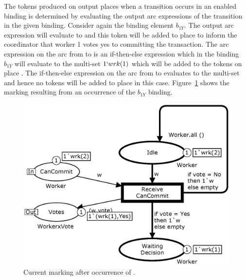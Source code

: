 
The tokens produced on output places when a transition occurs in an
enabled binding is determined by evaluating the output arc expressions
of the transition in the given binding. Consider again the binding
element $b_{1Y}$. The output arc expression  will
evaluate to  and this token will be added to
place  to inform the coordinator that worker 1 votes
yes to committing the transaction. The arc expression on the arc from
 to  is an
if-then-else expression which in the binding $b_{1Y}$ will evaluate to
the multi-set $1`wrk(1)$ which will be added to the tokens on place
. The if-then-else expression on the arc from
 to  evaluates to the
 multi-set and hence no tokens will be added to place
 in this case. Figure~\ref{fig:receivecancommit} shows
the marking resulting from an occurrence of the $b_{1Y}$ binding.

\begin{figure}[h]
\centering
\includegraphics[scale=.5]{figures/ReceiveCanCommit.eps}
\caption{Current marking after occurrence of .}
\label{fig:receivecancommit}
\end{figure}

